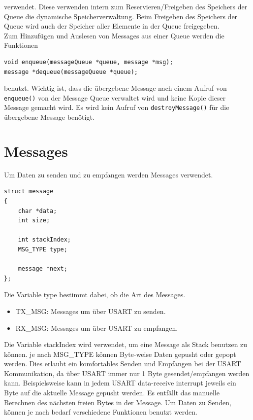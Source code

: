 \documentclass[fontsize=12pt, toc=bibliography, notitlepage]{scrreprt}
\begin{document}
verwendet. Diese verwenden intern zum Reservieren/Freigeben des Speichers der Queue die dynamische Speicherverwaltung. Beim Freigeben des Speichers der Queue wird auch der Speicher aller Elemente in der Queue freigegeben.\\

Zum Hinzufügen und Auslesen von Messages aus einer Queue werden die Funktionen

\begin{lstlisting}
void enqueue(messageQueue *queue, message *msg);
message *dequeue(messageQueue *queue);
\end{lstlisting}

benutzt. Wichtig ist, dass die übergebene Message nach einem Aufruf von \lstinline$enqueue()$ von der Message Queue verwaltet wird und keine Kopie dieser Message gemacht wird. Es wird kein Aufruf von \lstinline$destroyMessage()$ für die übergebene Message benötigt.

\section{Messages}
\label{subsec:shell-messages}
Um Daten zu senden und zu empfangen werden Messages verwendet.\\

\begin{lstlisting}
struct message
{
	char *data;
	int size;

	int stackIndex;
	MSG_TYPE type;

	message *next;
};
\end{lstlisting}

Die Variable type bestimmt dabei, ob die Art des Messages.
\begin{itemize}
	\item TX\_MSG: Messages um über USART zu senden.
	\item RX\_MSG: Messages um über USART zu empfangen.
\end{itemize}

Die Variable stackIndex wird verwendet, um eine Message als Stack benutzen zu können. je nach MSG\_TYPE können Byte-weise Daten gepusht oder gepopt werden. Dies erlaubt ein komfortables Senden und Empfangen bei der USART Kommunikation, da über USART immer nur 1 Byte gesendet/empfangen werden kann. Beispielsweise kann in jedem USART data-receive interrupt jeweils ein Byte auf die aktuelle Message gepusht werden. Es entfällt das manuelle Berechnen des nächsten freien Bytes in der Message. Um Daten zu Senden, können je nach bedarf verschiedene Funktionen benutzt werden.\\
\end{document}

